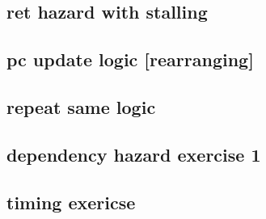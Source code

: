 \subsection{ret hazard with stalling}


\subsection{pc update logic [rearranging]}


\subsection{repeat same logic}


\subsection{dependency hazard exercise 1}


\subsection{timing exericse}


